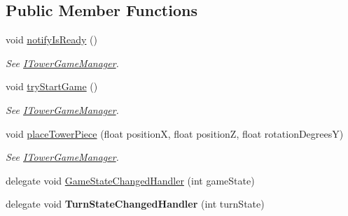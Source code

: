 \subsection*{Public Member Functions}
\begin{DoxyCompactItemize}
\item 
void \hyperlink{class_tower_v_r_1_1_tower_game_manager_a7ea173c143c836423cc25e8f0eed970d}{notify\+Is\+Ready} ()\hypertarget{class_tower_v_r_1_1_tower_game_manager_a7ea173c143c836423cc25e8f0eed970d}{}\label{class_tower_v_r_1_1_tower_game_manager_a7ea173c143c836423cc25e8f0eed970d}

\begin{DoxyCompactList}\small\item\em See \hyperlink{interface_tower_v_r_1_1_i_tower_game_manager}{I\+Tower\+Game\+Manager}. \end{DoxyCompactList}\item 
void \hyperlink{class_tower_v_r_1_1_tower_game_manager_a489f27c61ec3d5c29ac56fea0a024cf6}{try\+Start\+Game} ()\hypertarget{class_tower_v_r_1_1_tower_game_manager_a489f27c61ec3d5c29ac56fea0a024cf6}{}\label{class_tower_v_r_1_1_tower_game_manager_a489f27c61ec3d5c29ac56fea0a024cf6}

\begin{DoxyCompactList}\small\item\em See \hyperlink{interface_tower_v_r_1_1_i_tower_game_manager}{I\+Tower\+Game\+Manager}. \end{DoxyCompactList}\item 
void \hyperlink{class_tower_v_r_1_1_tower_game_manager_aaa476cfb148a19c6579c38823dd37fd3}{place\+Tower\+Piece} (float positionX, float positionZ, float rotation\+DegreesY)\hypertarget{class_tower_v_r_1_1_tower_game_manager_aaa476cfb148a19c6579c38823dd37fd3}{}\label{class_tower_v_r_1_1_tower_game_manager_aaa476cfb148a19c6579c38823dd37fd3}

\begin{DoxyCompactList}\small\item\em See \hyperlink{interface_tower_v_r_1_1_i_tower_game_manager}{I\+Tower\+Game\+Manager}. \end{DoxyCompactList}\item 
delegate void \hyperlink{class_tower_v_r_1_1_tower_game_manager_a4bfd43a7fbaab6c26aa918ff220f11f8}{Game\+State\+Changed\+Handler} (int game\+State)
\item 
delegate void {\bfseries Turn\+State\+Changed\+Handler} (int turn\+State)\hypertarget{class_tower_v_r_1_1_tower_game_manager_aa05ec13ba870bbe24fe436ffe251889e}{}\label{class_tower_v_r_1_1_tower_game_manager_aa05ec13ba870bbe24fe436ffe251889e}


\end{DoxyCompactItemize}
